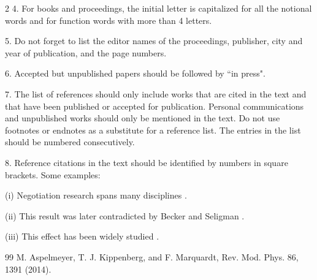 \documentclass[fleqn]{2026SCGE}
\begin{document}
\begin{multicols}{2}
4. For books and proceedings, the initial letter is capitalized for all the notional words and for function words with more than 4 letters.

5. Do not forget to list the editor names of the proceedings, publisher, city and year of publication, and the page numbers.

6. Accepted but unpublished papers should be followed by ``in press".

7. The list of references should only include works that are cited in the text and that have been published or accepted for publication. Personal communications and unpublished works should only be mentioned in the text. Do not use footnotes or endnotes as a substitute for a reference list. The entries in the list should be numbered consecutively.

8. Reference citations in the text should be identified by numbers in square brackets. Some examples:

(i) Negotiation research spans many disciplines \cite{ref1}.

(ii) This result was later contradicted by Becker and Seligman \cite{ref2}.

(iii) This effect has been widely studied \cite{ref3,ref4,ref5,ref6,ref7}.










\begin{thebibliography}{99}
 M. Aspelmeyer, T. J. Kippenberg, and F. Marquardt, Rev. Mod. Phys. 86, 1391 (2014).


\end{thebibliography}
\end{multicols}
\end{document}
